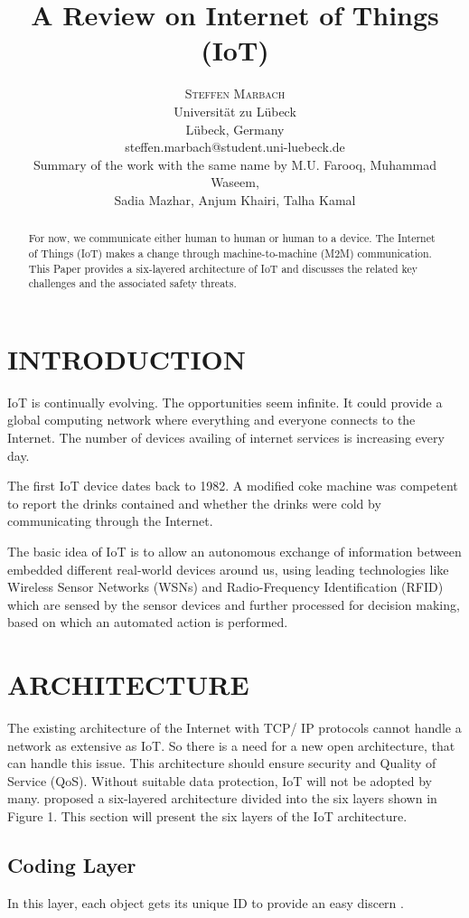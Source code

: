 \documentclass[twoside,twocolumn]{article}
\title{\textbf{A Review on Internet of Things (IoT)}}
\author{
    \textsc{Steffen Marbach} \\[0.5ex]
    \normalsize Universität zu Lübeck \\
    \normalsize Lübeck, Germany \\
    \normalsize steffen.marbach@student.uni-luebeck.de \\[1.5ex]
    \normalsize Summary of the work with the same name by M.U. Farooq, Muhammad Waseem, \\
    \normalsize Sadia Mazhar, Anjum Khairi, Talha Kamal \cite{AReViewOnInternetOfThings}
}
\date{}
\begin{document}
\maketitle

\begin{abstract}
   \noindent For now, we communicate either human to human or human to a device. The Internet of Things (IoT) makes a change through machine-to-machine (M2M) communication. This Paper provides a six-layered architecture of IoT and discusses the related key challenges and the associated safety threats.
\end{abstract}

\section{INTRODUCTION}
    \noindent IoT is continually evolving. The opportunities seem infinite. It could provide a global computing network where everything and everyone connects to the Internet. The number of devices availing of internet services is increasing every day.
    
    The first IoT device dates back to 1982. A modified coke machine was competent to report the drinks contained and whether the drinks were cold by communicating through the Internet\cite{CokeMachine}.
    
    The basic idea of IoT is to allow an autonomous exchange of information between embedded different real-world devices around us, using leading technologies like Wireless Sensor Networks (WSNs) and Radio-Frequency Identification (RFID) which are sensed by the sensor devices and further processed for decision making, based on which an automated action is performed.
    
\section{ARCHITECTURE}
    \noindent The existing architecture of the Internet with TCP/ IP protocols cannot handle a network as extensive as IoT. So there is a need for a new open architecture, that can handle this issue. This architecture should ensure security and Quality of Service (QoS). Without suitable data protection, IoT will not be adopted by many. \cite{ArchitectureIoT} proposed a six-layered architecture divided into the six layers shown in Figure 1. This section will present the six layers of the IoT architecture.
    \subsection{Coding Layer}
        \noindent In this layer, each object gets its unique ID to provide an easy discern \cite{ArchitectureIoT}.        
\end{document}
